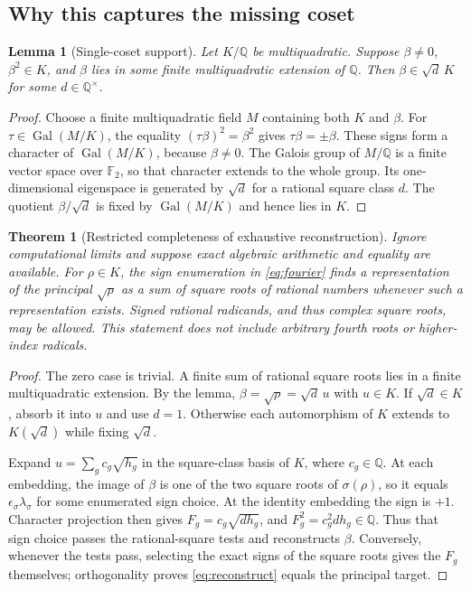 \documentclass[11pt,a4paper]{article}
\newcommand{\Q}{\mathbb Q}\newcommand{\C}{\mathbb C}
\newcommand{\Gal}{\operatorname{Gal}}\newcommand{\Nrm}{\operatorname{N}}
\newtheorem{theorem}[proposition]{Theorem}
\newtheorem{lemma}[proposition]{Lemma}
\theoremstyle{definition}\newtheorem{definition}[proposition]{Definition}
\theoremstyle{remark}\newtheorem{remark}[proposition]{Remark}
\begin{document}
\subsection{Why this captures the missing coset}
\begin{lemma}[Single-coset support]
Let $K/\Q$ be multiquadratic. Suppose $\beta\ne0$, $\beta^2\in K$, and $\beta$
lies in some finite multiquadratic extension of $\Q$. Then
$\beta\in\sqrt d\,K$ for some $d\in\Q^\times$.
\end{lemma}
\begin{proof}
Choose a finite multiquadratic field $M$ containing both $K$ and $\beta$.
For $\tau\in\Gal(M/K)$, the equality
$(\tau\beta)^2=\beta^2$ gives $\tau\beta=\pm\beta$. These signs form a character
of $\Gal(M/K)$, because $\beta\ne0$. The Galois group of $M/\Q$ is a finite
vector space over $\mathbb F_2$, so that character extends to the whole group.
Its one-dimensional eigenspace is generated by $\sqrt d$ for a rational square
class $d$. The quotient $\beta/\sqrt d$ is fixed by $\Gal(M/K)$ and hence lies
in $K$.
\end{proof}

\begin{theorem}[Restricted completeness of exhaustive reconstruction]
Ignore computational limits and suppose exact algebraic arithmetic and equality
are available. For $\rho\in K$, the sign enumeration in \eqref{eq:fourier}
finds a representation of the principal $\sqrt\rho$ as a sum of square roots of
rational numbers whenever such a representation exists. Signed rational
radicands, and thus complex square roots, may be allowed. This statement does
not include arbitrary fourth roots or higher-index radicals.
\end{theorem}
\begin{proof}
The zero case is trivial. A finite sum of rational square roots lies in a finite
multiquadratic extension. By the lemma, $\beta=\sqrt\rho=\sqrt d\,u$ with $u\in K$.
If $\sqrt d\in K$, absorb it into $u$ and use $d=1$. Otherwise each automorphism
of $K$ extends to $K(\sqrt d)$ while fixing $\sqrt d$.

Expand $u=\sum_g c_g\sqrt{h_g}$ in the square-class basis of $K$, where
$c_g\in\Q$. At each embedding, the image of $\beta$ is one of the two square
roots of $\sigma(\rho)$, so it equals
$\epsilon_\sigma\lambda_\sigma$ for some enumerated sign choice. At the identity
embedding the sign is $+1$. Character projection then gives
$F_g=c_g\sqrt{d h_g}$, and $F_g^2=c_g^2dh_g\in\Q$.
Thus that sign choice passes the rational-square tests and reconstructs $\beta$.
Conversely, whenever the tests pass, selecting the exact signs of the square
roots gives the $F_g$ themselves; orthogonality proves
\eqref{eq:reconstruct} equals the principal target.
\end{proof}
\end{document}
